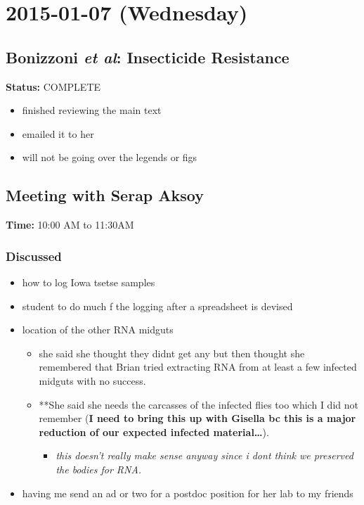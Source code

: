 \documentclass[letterpaper]{scrartcl}
\begin{document}
\section{2015-01-07 (Wednesday)}\label{wednesday}

\subsection{Bonizzoni \emph{et al}: Insecticide
Resistance}\label{bonizzoni-et-al-insecticide-resistance-1}

\textbf{Status:} COMPLETE

\begin{itemize}
\itemsep1pt\parskip0pt
\item
  finished reviewing the main text
\item
  emailed it to her
\item
  will not be going over the legends or figs
\end{itemize}

\subsection{Meeting with Serap Aksoy}\label{meeting-with-serap-aksoy}

\textbf{Time:} 10:00 AM to 11:30AM

\subsubsection{Discussed}\label{discussed}

\begin{itemize}
\itemsep1pt\parskip0pt
\item
  how to log Iowa tsetse samples
\item
  student to do much f the logging after a spreadsheet is devised
\item
  location of the other RNA midguts

  \begin{itemize}
  \itemsep1pt\parskip0pt
  \item
    she said she thought they didnt get any but then thought she
    remembered that Brian tried extracting RNA from at least a few
    infected midguts with no success.
  \item
    **She said she needs the carcasses of the infected flies too which I
    did not remember (\textbf{I need to bring this up with Gisella bc
    this is a major reduction of our expected infected
    material\ldots{}}).

    \begin{itemize}
    \itemsep1pt\parskip0pt
    \item
      \emph{this doesn't really make sense anyway since i dont think we
      preserved the bodies for RNA.}
    \end{itemize}
  \end{itemize}
\item
  having me send an ad or two for a postdoc position for her lab to my
  friends
\end{itemize}
\end{document}
